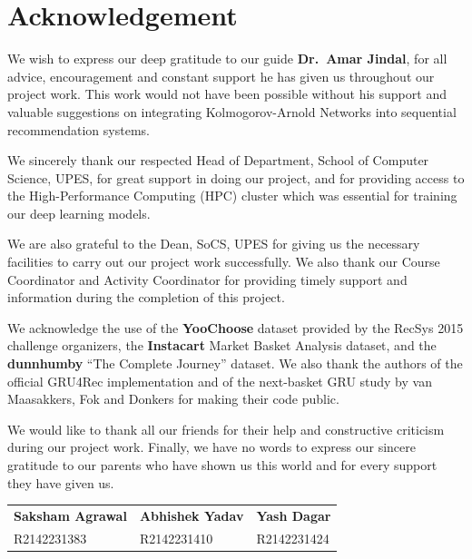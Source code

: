 \chapter*{Acknowledgement}

We wish to express our deep gratitude to our guide \textbf{Dr.\ Amar Jindal},
for all advice, encouragement and constant support he has given us throughout our
project work. This work would not have been possible without his support and
valuable suggestions on integrating Kolmogorov-Arnold Networks into sequential
recommendation systems.

We sincerely thank our respected Head of Department, School of Computer
Science, UPES, for great support in doing our project, and for providing access
to the High-Performance Computing (HPC) cluster which was essential for training
our deep learning models.

We are also grateful to the Dean, SoCS, UPES for giving us the necessary facilities
to carry out our project work successfully. We also thank our Course
Coordinator and Activity Coordinator for providing timely support and information
during the completion of this project.

We acknowledge the use of the \textbf{YooChoose} dataset provided by the RecSys 2015
challenge organizers, the \textbf{Instacart} Market Basket Analysis dataset, and
the \textbf{dunnhumby} ``The Complete Journey'' dataset. We also thank the authors
of the official GRU4Rec implementation and of the next-basket GRU study by van
Maasakkers, Fok and Donkers for making their code public.

We would like to thank all our friends for their help and constructive criticism
during our project work. Finally, we have no words to express our sincere gratitude
to our parents who have shown us this world and for every support they have given us.

\vspace{1.5cm}

\noindent
\begin{tabular}{p{4cm} p{4cm} p{4cm}}
\textbf{Saksham Agrawal} & \textbf{Abhishek Yadav} & \textbf{Yash Dagar} \\
R2142231383 & R2142231410 & R2142231424 \\
\end{tabular}

